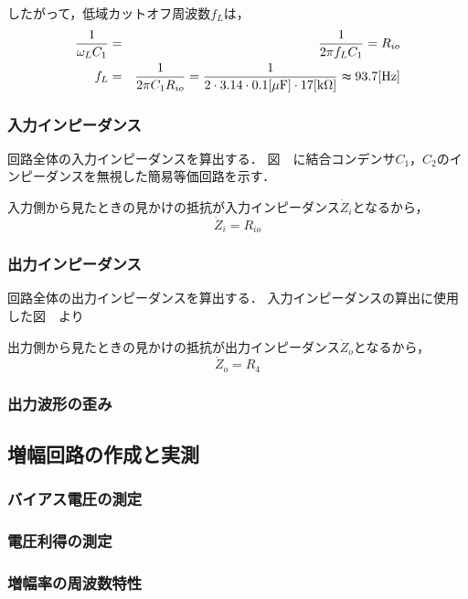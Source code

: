 \documentclass[dvipdfmx,titlepage,a4j]{jsarticle}  %
\numberwithin{equation}{section}
\begin{document}
したがって，低域カットオフ周波数$f_L$は，
\begin{eqnarray}
  \frac{1}{\omega_L C_1} &=& \frac{1}{2 \pi f_L C_1} = R_{io} \\
  f_L &=& \frac{1}{2 \pi C_1 R_{io}} =  \frac{1}{2 \cdot 3.14 \cdot 0.1\mathrm{[\mu F]} \cdot 17 \mathrm{[k \Omega]}} \thickapprox 93.7\mathrm{[Hz]}
\end{eqnarray}

\subsubsection{入力インピーダンス}
回路全体の入力インピーダンスを算出する．
図　に結合コンデンサ$C_1$，$C_2$のインピーダンスを無視した簡易等価回路を示す．

入力側から見たときの見かけの抵抗が入力インピーダンス$\dot{Z}_i$となるから，
\begin{equation}
  \dot{Z}_i = R_{io}
\end{equation}

\subsubsection{出力インピーダンス}
回路全体の出力インピーダンスを算出する．
入力インピーダンスの算出に使用した図　より

出力側から見たときの見かけの抵抗が出力インピーダンス$\dot{Z}_o$となるから，
\begin{equation}
  \dot{Z}_o = R_4
\end{equation}

\subsubsection{出力波形の歪み}

\subsection{増幅回路の作成と実測}

\subsubsection{バイアス電圧の測定}

\subsubsection{電圧利得の測定}

\subsubsection{増幅率の周波数特性}
\end{document}
